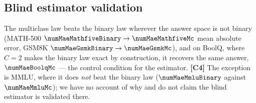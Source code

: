 \subsection{Blind estimator validation}

The multiclass law beats the binary law wherever the answer space is not binary
(MATH-500 $\numMaeMathfiveBinary \to \numMaeMathfiveMc$ mean absolute error,
GSM8K $\numMaeGsmkBinary \to \numMaeGsmkMc$), and on BoolQ, where $C=2$ makes the
binary law exact by construction, it recovers the same answer,
$\numMaeBoolqMc$ --- the control condition for the estimator. \textbf{[C4]} The
exception is MMLU, where it does \emph{not} beat the binary law
($\numMaeMmluBinary$ against $\numMaeMmluMc$); we have no account of why and do
not claim the blind estimator is validated there.
